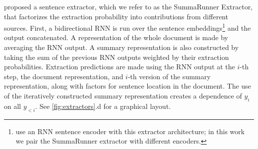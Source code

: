 
\citet{nallapati2017summarunner} proposed
a sentence extractor, which we refer to as the SummaRunner Extractor,
that factorizes the extraction probability into contributions 
from different sources.
First, a bidirectional RNN is run over the sentence embeddings\footnote{\citet{nallapati2017summarunner}
    use an RNN sentence encoder with 
this extractor architecture; in this work we pair the SummaRunner extractor
with different encoders. } and the output
concatenated. A representation of the whole document is made by 
averaging the RNN output. A summary representation is also constructed 
by taking the sum of the previous RNN outputs weighted by their extraction
probabilities. Extraction predictions are made using 
the RNN output at the $i$-th step, the document representation, and 
$i$-th version of the summary representation, along with factors for 
sentence location in the document. The use of the iteratively constructed
summary representation creates a dependence of $y_i$ on all $y_{<i}$.
See \autoref{fig:extractors}.d for a graphical layout.



